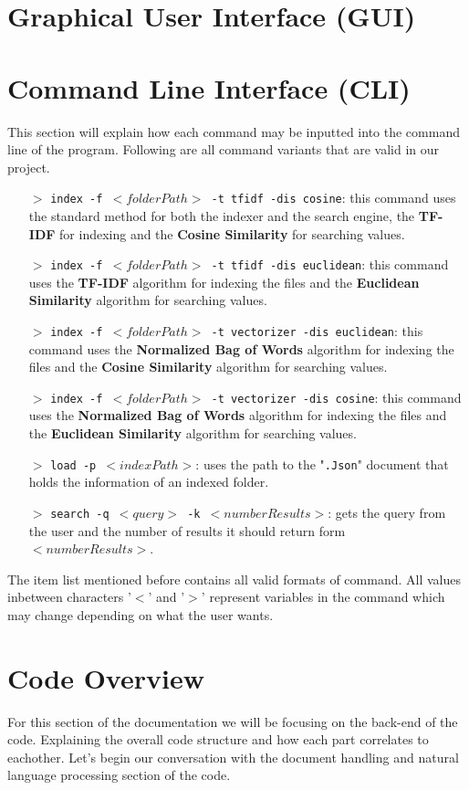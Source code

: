 \documentclass{article}
\begin{document}
\section{Graphical User Interface (GUI)}

\section{Command Line Interface (CLI)}
This section will explain how each command may be inputted into the command line of the program. Following are all command variants that are valid in our project.
\begin{itemize}
    \item[$>$] \texttt{index -f $<folderPath>$ -t tfidf -dis cosine}: this command uses the standard method for both the indexer and the search engine, the \textbf{TF-IDF} for indexing and the \textbf{Cosine Similarity} for searching values. 
    \item[$>$] \texttt{index -f $<folderPath>$ -t tfidf -dis euclidean}: this command uses the \textbf{TF-IDF} algorithm for indexing the files and the \textbf{Euclidean Similarity} algorithm for searching values. 
    \item[$>$] \texttt{index -f $<folderPath>$ -t vectorizer -dis euclidean}: this command uses the \textbf{Normalized Bag of Words} algorithm for indexing the files and the \textbf{Cosine Similarity} algorithm for searching values. 
    \item[$>$] \texttt{index -f $<folderPath>$ -t vectorizer -dis cosine}: this command uses the \textbf{Normalized Bag of Words} algorithm for indexing the files and the \textbf{Euclidean Similarity} algorithm for searching values. 
    \item[$>$] \texttt{load -p $<indexPath>$}: uses the path to the "\texttt{.Json}" document that holds the information of an indexed folder.  
    \item[$>$] \texttt{search -q $<query>$ -k $<numberResults>$}: gets the query from the user and the number of results it should return form $<numberResults>$. 
\end{itemize}
The item list mentioned before contains all valid formats of command. All values inbetween characters '$<$' and '$>$' represent variables in the command which may change depending on what the user wants. 

\section{Code Overview}
For this section of the documentation we will be focusing on the back-end of the code. Explaining the overall code structure and how each part correlates to eachother. Let's begin our conversation with the document handling and natural language processing section of the code.
\end{document}
